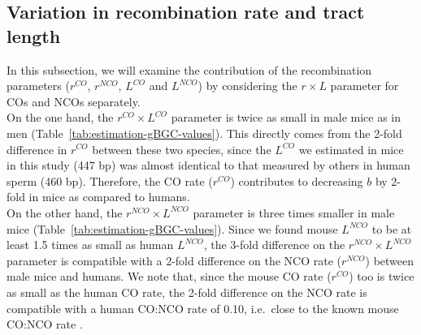 \subsection{Variation in recombination rate and tract length}


In this subsection, we will examine the contribution of the recombination parameters ($r^{CO}$, $r^{NCO}$, $L^{CO}$ and $L^{NCO}$) by considering the $r \times L$ parameter for COs and NCOs separately.\\

On the one hand, the $r^{CO} \times L^{CO}$ parameter is twice as small in male mice as in men (Table~\ref{tab:estimation-gBGC-values}).
This directly comes from the 2-fold difference in $r^{CO}$ between these two species, since the $L^{CO}$ we estimated in mice in this study (447 bp) was almost identical to that measured by others in human sperm (460 bp).
Therefore, the CO rate ($r^{CO}$) contributes to decreasing $b$ by 2-fold in mice as compared to humans.\\

On the other hand, the $r^{NCO} \times L^{NCO}$ parameter is three times smaller in male mice (Table~\ref{tab:estimation-gBGC-values}).
Since we found mouse $L^{NCO}$ to be at least 1.5 times as small as human $L^{NCO}$, the 3-fold difference on the $r^{NCO} \times L^{NCO}$ parameter is compatible with a 2-fold difference on the NCO rate ($r^{NCO}$) between male mice and humans.
We note that, since the mouse CO rate ($r^{CO}$) too is twice as small as the human CO rate, the 2-fold difference on the NCO rate is compatible with a human CO:NCO rate of 0.10, i.e.\ close to the known mouse CO:NCO rate \citep{cole2010comprehensive}.





